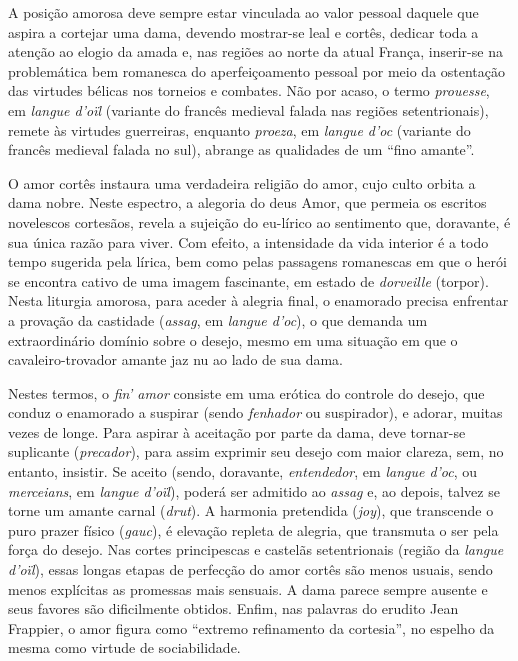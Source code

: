 A posição amorosa deve sempre estar vinculada ao valor pessoal daquele que
aspira a cortejar uma dama, devendo mostrar-se leal e cortês, dedicar toda a
atenção ao elogio da amada e, nas regiões ao norte da atual França, inserir-se
na problemática bem romanesca do aperfeiçoamento pessoal por meio da ostentação
das virtudes bélicas nos torneios e combates. Não por acaso, o termo
\textit{prouesse}, em \textit{langue d’oïl }(variante do francês medieval
falada nas regiões setentrionais), remete às virtudes guerreiras,
enquanto \textit{proeza}, em \textit{langue d’oc }(variante do francês medieval
falada no sul), abrange as qualidades de um “fino amante”.  

O amor cortês instaura uma verdadeira religião do amor, cujo culto orbita a dama
nobre. Neste espectro, a alegoria do deus Amor, que permeia os escritos
novelescos cortesãos, revela a sujeição do eu-lírico ao sentimento que,
doravante, é sua única razão para viver. Com efeito, a intensidade da vida
interior é a todo tempo sugerida pela lírica, bem como pelas passagens
romanescas em que o herói se encontra cativo de uma imagem fascinante, em
estado de \textit{dorveille} (torpor). Nesta liturgia amorosa, para aceder à
alegria final, o enamorado precisa enfrentar a provação da castidade
(\textit{assag}, em \textit{langue d’oc}), o que demanda um extraordinário
domínio sobre o desejo, mesmo em uma situação em que o cavaleiro-trovador
amante jaz nu ao lado de sua dama. 

Nestes termos, o \textit{fin’ amor} consiste em uma erótica do controle do
desejo, que conduz o enamorado a suspirar (sendo \textit{fenhador} ou
suspirador), e adorar, muitas vezes de longe. Para aspirar à aceitação por
parte da dama, deve tornar-se suplicante (\textit{precador}), para assim
exprimir seu desejo com maior clareza, sem, no entanto, insistir. Se aceito
(sendo, doravante, \textit{entendedor}, em \textit{langue d’oc}, ou
\textit{merceians}, em \textit{langue d’oïl}), poderá ser admitido ao
\textit{assag} e, ao depois, talvez se torne um amante carnal (\textit{drut}).
A harmonia pretendida (\textit{joy}), que transcende o puro prazer físico
(\textit{gauc}), é elevação repleta de alegria, que transmuta o ser pela força
do desejo. Nas cortes principescas e castelãs setentrionais (região da
\textit{langue d’oïl}), essas longas etapas de perfecção do amor cortês são
menos usuais, sendo menos explícitas as promessas mais sensuais. A dama parece
sempre ausente e seus favores são dificilmente obtidos. Enfim, nas palavras do
erudito Jean Frappier, o amor figura como “extremo refinamento da cortesia”, no
espelho da mesma como virtude de sociabilidade. 

